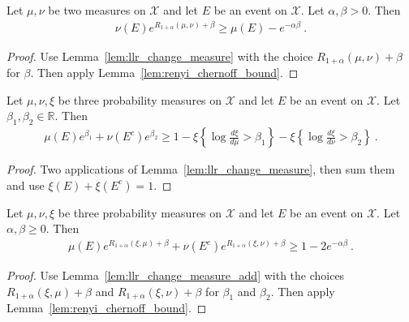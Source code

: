 \begin{lemma}
  \label{lem:renyi_change_measure}
  \leanok
  Let $\mu, \nu$ be two measures on $\mathcal X$ and let $E$ be an event on $\mathcal X$. Let $\alpha,\beta > 0$. Then
  \begin{align*}
  \nu(E) e^{R_{1+\alpha}(\mu, \nu) + \beta} \ge \mu(E) - e^{-\alpha \beta} \: .
  \end{align*}
\end{lemma}

\begin{proof}
Use Lemma~\ref{lem:llr_change_measure} with the choice $R_{1+\alpha}(\mu, \nu) + \beta$ for $\beta$. Then apply Lemma~\ref{lem:renyi_chernoff_bound}.
\end{proof}

\begin{lemma}
  \label{lem:llr_change_measure_add}
  \leanok
  Let $\mu, \nu, \xi$ be three probability measures on $\mathcal X$ and let $E$ be an event on $\mathcal X$. Let $\beta_1, \beta_2 \in \mathbb{R}$. Then
  \begin{align*}
  \mu(E) e^{\beta_1} + \nu(E^c) e^{\beta_2} \ge 1 - \xi\left\{ \log\frac{d \xi}{d \mu} > \beta_1 \right\} - \xi\left\{ \log\frac{d \xi}{d \nu} > \beta_2 \right\} \: .
  \end{align*}
\end{lemma}

\begin{proof}\leanok
{}
Two applications of Lemma~\ref{lem:llr_change_measure}, then sum them and use $\xi(E)+\xi(E^c) = 1$.
\end{proof}

\begin{lemma}
  \label{lem:renyi_change_measure_add}
  \leanok
  Let $\mu, \nu, \xi$ be three probability measures on $\mathcal X$ and let $E$ be an event on $\mathcal X$. Let $\alpha, \beta \ge 0$. Then
  \begin{align*}
  \mu(E) e^{R_{1+\alpha}(\xi, \mu) + \beta} + \nu(E^c) e^{R_{1+\alpha}(\xi, \nu) + \beta} \ge 1 - 2 e^{-\alpha \beta} \: .
  \end{align*}
\end{lemma}

\begin{proof}\leanok
{}
Use Lemma~\ref{lem:llr_change_measure_add} with the choices $R_{1+\alpha}(\xi, \mu) + \beta$ and $R_{1+\alpha}(\xi, \nu) + \beta$ for $\beta_1$ and $\beta_2$.
Then apply Lemma~\ref{lem:renyi_chernoff_bound}.
\end{proof}


